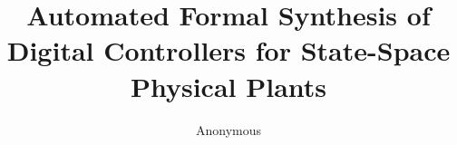 \documentclass[runningheads,a4paper]{llncs}
\begin{document}
\newcommand\tool{{\sf DSSynth}\xspace}

\mainmatter  %

\title{Automated Formal Synthesis of Digital Controllers for State-Space Physical Plants} 


%
%
%


%
%

\author{Anonymous}
\institute{}

\maketitle
\end{document}
